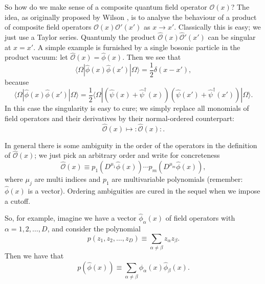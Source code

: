 \documentclass[prl,twocolumn,lengthcheck,superscriptaddress]{revtex4-1}
\theoremstyle{definition}
\theoremstyle{remark}
\begin{document}
So how do we make sense of a composite quantum field operator $\mathcal{O}(x)$? The idea, as originally proposed by Wilson \cite{wilson:1969a}, is to analyse the behaviour of a product of composite field operators $\mathcal{O}(x)\mathcal{O}'(x')$ as $x\rightarrow x'$. Classically this is easy; we just use a Taylor series. Quantumly the product $\widehat{\mathcal{O}}(x)\widehat{\mathcal{O}}'(x')$ can be singular at $x=x'$. A simple example is furnished by a single bosonic particle in the product vacuum: let $\widehat{\mathcal{O}}(x) = \widehat{\phi}(x)$. Then we see that
\begin{equation}
	\langle \Omega|\widehat{\phi}(x)\widehat{\phi}(x')|\Omega\rangle = \frac12\delta(x-x'),
\end{equation}
because 
\begin{equation}
	\langle \Omega|\widehat{\phi}(x)\widehat{\phi}(x')|\Omega\rangle = \frac12\langle \Omega|(\widehat{\psi}(x) + \widehat{\psi}^\dag(x))(\widehat{\psi}(x')+\widehat{\psi}^\dag(x'))|\Omega\rangle.
\end{equation}
In this case the singularity is easy to cure; we simply replace all monomials of field operators and their derivatives by their normal-ordered counterpart:
\begin{equation}
	\widehat{\mathcal{O}}(x) \mapsto {:}\widehat{\mathcal{O}}(x){:}.
\end{equation} 

In general there is some ambiguity in the order of the operators in the definition of $\widehat{\mathcal{O}}(x)$; we just pick an arbitrary order and write for concreteness
\begin{equation}
	\widehat{\mathcal{O}}(x) \equiv p_1(D^{\mu_1}\widehat{\phi}(x))\cdots p_m(D^{\mu_m}\widehat{\phi}(x)),
\end{equation}
where $\mu_j$ are multi indices and $p_1$ are multivariable polynomials (remember: $\widehat{\phi}(x)$ is a vector). Ordering ambiguities are cured in the sequel when we impose a cutoff.

So, for example, imagine we have a vector $\widehat{\phi}_\alpha(x)$ of field operators with $\alpha = 1, 2, \ldots, D$, and consider the polynomial 
\begin{equation}
	p(z_1, z_2, \ldots, z_D) \equiv \sum_{\alpha\not=\beta} z_\alpha z_\beta.
\end{equation}
Then we have that
\begin{equation}
	p(\widehat{\phi}(x)) \equiv \sum_{\alpha\not=\beta} \widehat{\phi}_\alpha(x) \widehat{\phi}_\beta(x).
\end{equation}
\end{document}

